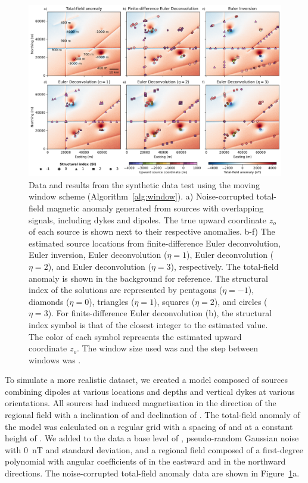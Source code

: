 \begin{figure}[tb!]
\centering
\includegraphics[width=1\linewidth]{figures/synthetic-windows.png}
\caption{
    Data and results from the synthetic data test using the moving window scheme (Algorithm~\ref{alg:window}).
    a) Noise-corrupted total-field magnetic anomaly generated from \SynWinNSources{} sources with overlapping signals, including dykes and dipoles. The true upward coordinate $z_o$ of each source is shown next to their respective anomalies.
    b-f) The estimated source locations from finite-difference Euler deconvolution, Euler inversion, Euler deconvolution ($\eta=1$), Euler deconvolution ($\eta=2$), and Euler deconvolution ($\eta=3$), respectively. The total-field anomaly is shown in the background for reference.
    The structural index of the solutions are represented by pentagons ($\eta=-1$),  diamonds ($\eta=0$),  triangles ($\eta=1$),  squares ($\eta=2$), and circles ($\eta=3$).
    For finite-difference Euler deconvolution (b), the structural index symbol is that of the closest integer to the estimated value.
    The color of each symbol represents the estimated upward coordinate $z_o$.
    The window size used was \SynWinWindowSize{} and the step between windows was \SynWinWindowStep{}.
}
\label{fig:windows}
\end{figure}

To simulate a more realistic dataset, we created a model composed of \SynWinNSources{} sources combining dipoles at various locations and depths and vertical dykes at various orientations.
All sources had induced magnetisation in the direction of the regional field with a inclination of \SynWinInc{} and declination of \SynWinDec{}.
The total-field anomaly of the model was calculated on a regular grid with a spacing of \SynWinSpacing{} and at a constant height of \SynWinHeight{}.
We added to the data a base level of \SynWinBase{}, pseudo-random Gaussian noise with \qty{0}{\nano\tesla} and \SynWinNoise{} standard deviation, and a regional field composed of a first-degree polynomial with angular coefficients of \SynWinRegionalE{} in the eastward and \SynWinRegionalN{} in the northward directions.
The noise-corrupted total-field anomaly data are shown in Figure~\ref{fig:windows}a.

